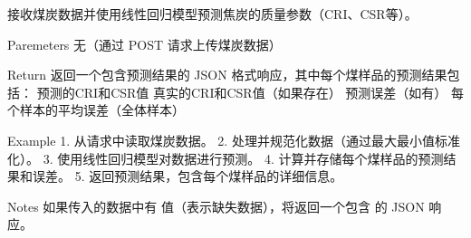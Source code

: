 \documentclass[a4paper,12pt,english]{sphinxmanual}
\begin{document}

\begin{fulllineitems}
\label{\detokenize{api/login:login.getCokeQualityfyeResultAILinear}}
\pysigstartsignatures
{}
\pysigstopsignatures
\sphinxAtStartPar
接收煤炭数据并使用线性回归模型预测焦炭的质量参数（CRI、CSR等）。

\sphinxAtStartPar
Paremeters
无（通过 POST 请求上传煤炭数据）

\sphinxAtStartPar
Return
返回一个包含预测结果的 JSON 格式响应，其中每个煤样品的预测结果包括：
\sphinxhyphen{} 预测的CRI和CSR值
\sphinxhyphen{} 真实的CRI和CSR值（如果存在）
\sphinxhyphen{} 预测误差（如有）
\sphinxhyphen{} 每个样本的平均误差（全体样本）

\sphinxAtStartPar
Example
1. 从请求中读取煤炭数据。
2. 处理并规范化数据（通过最大最小值标准化）。
3. 使用线性回归模型对数据进行预测。
4. 计算并存储每个煤样品的预测结果和误差。
5. 返回预测结果，包含每个煤样品的详细信息。

\sphinxAtStartPar
Notes
如果传入的数据中有  值（表示缺失数据），将返回一个包含  的 JSON 响应。

\end{fulllineitems}

\end{document}

